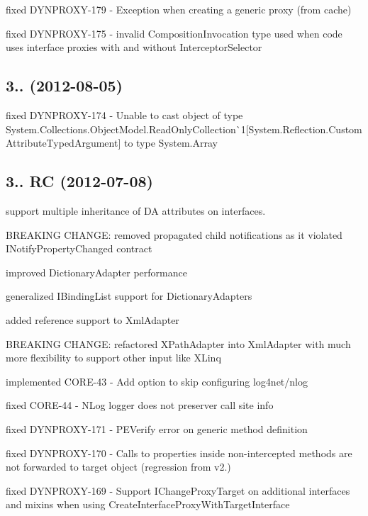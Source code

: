 \begin{DoxyItemize}
\item fixed D\+Y\+N\+P\+R\+O\+X\+Y-\/179 -\/ Exception when creating a generic proxy (from cache)
\item fixed D\+Y\+N\+P\+R\+O\+X\+Y-\/175 -\/ invalid Composition\+Invocation type used when code uses interface proxies with and without Interceptor\+Selector
\end{DoxyItemize}

\subsection*{3.. (2012-\/08-\/05)}


\begin{DoxyItemize}
\item fixed D\+Y\+N\+P\+R\+O\+X\+Y-\/174 -\/ Unable to cast object of type \textquotesingle{}System.\+Collections.\+Object\+Model.\+Read\+Only\+Collection\`{}1[System.\+Reflection.\+Custom\+Attribute\+Typed\+Argument]\textquotesingle{} to type \textquotesingle{}System.\+Array\textquotesingle{}
\end{DoxyItemize}

\subsection*{3.. RC (2012-\/07-\/08)}


\begin{DoxyItemize}
\item support multiple inheritance of DA attributes on interfaces.
\item B\+R\+E\+A\+K\+I\+NG C\+H\+A\+N\+GE\+: removed propagated child notifications as it violated I\+Notify\+Property\+Changed contract
\item improved Dictionary\+Adapter performance
\item generalized I\+Binding\+List support for Dictionary\+Adapters
\item added reference support to Xml\+Adapter
\item B\+R\+E\+A\+K\+I\+NG C\+H\+A\+N\+GE\+: refactored X\+Path\+Adapter into Xml\+Adapter with much more flexibility to support other input like X\+Linq
\item implemented C\+O\+R\+E-\/43 -\/ Add option to skip configuring log4net/nlog
\item fixed C\+O\+R\+E-\/44 -\/ N\+Log logger does not preserver call site info
\item fixed D\+Y\+N\+P\+R\+O\+X\+Y-\/171 -\/ P\+E\+Verify error on generic method definition
\item fixed D\+Y\+N\+P\+R\+O\+X\+Y-\/170 -\/ Calls to properties inside non-\/intercepted methods are not forwarded to target object (regression from v2.)
\item fixed D\+Y\+N\+P\+R\+O\+X\+Y-\/169 -\/ Support I\+Change\+Proxy\+Target on additional interfaces and mixins when using Create\+Interface\+Proxy\+With\+Target\+Interface
\end{DoxyItemize}


